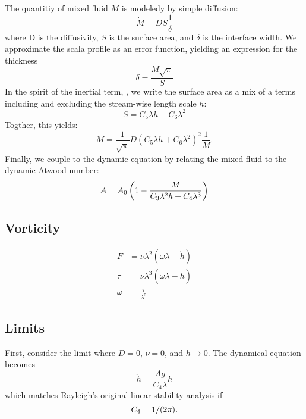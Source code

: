 The quantitiy of mixed fluid $M$ is modeledy by simple diffusion:
\begin{equation}
\dot{M} = D S \frac{1}{\delta}
\end{equation}
where D is the diffusivity,
$S$ is the surface area, and 
$\delta$ is the interface width.
We approximate the scala profile as an error function, yielding an expression for the thickness
\begin{equation}
\delta = \frac{M \sqrt{\pi}}{S}
\end{equation}
In the spirit of the inertial term, , we write the surface area as a mix of a terms including and excluding the stream-wise length scale $h$:
\begin{equation}
S = C_5 \lambda h + C_6 \lambda^2
\end{equation}
Togther, this yields:
\begin{equation}
\dot{M} = \frac{1}{\sqrt{\pi}} D (C_5 \lambda h + C_6 \lambda^2)^2 \frac{1}{M}.
\end{equation}
Finally, we couple to the dynamic equation by relating the mixed fluid to the dynamic Atwood number:
\begin{equation} \elabel{effective-atwood}
A = A_0 \left(1 - \frac{M}{C_3 \lambda^2 h  + C_4 \lambda^3} \right)
\end{equation}

\subsection{Vorticity}
\begin{align*}
F &= \nu \lambda^2 ( \omega \lambda - \dot{h} ) \\
\tau &= \nu \lambda^3 ( \omega \lambda - \dot{h} )  \\
\dot{\omega} &= \frac{\tau}{\lambda^5} 
\end{align*}

\subsection{Limits}
First, consider the limit where $D = 0$, $\nu = 0$, and $h \rightarrow 0$.
The dynamical equation becomes
\begin{equation}
\ddot{h} = \frac{A g }{C_4 \lambda} h
\end{equation}
which matches Rayleigh's original linear stability analysis if 
\begin{equation} \elabel{c4}
C_4 = 1/(2 \pi).
\end{equation}


